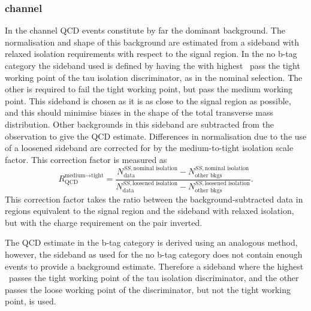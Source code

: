 \subsubsection{\texorpdfstring{\tautau channel}{tau tau channel}}
\label{sec:mssm_bkgs_qcd_tt}
In the \tautau channel QCD events constitute by far the dominant background.
The normalisation and shape 
of this background are estimated from a sideband with relaxed 
isolation requirements with respect to the signal region. 
In the no b-tag category the sideband used is defined
by having the \Pgth with highest \pT~pass the tight working
point of the tau isolation discriminator, as in the nominal selection.
The other \Pgth is required to fail the tight working point,
but pass the medium working point. This sideband is 
chosen as it is as close to the signal region as possible, and 
this should minimise biases in the shape of the total transverse mass
distribution. Other backgrounds
in this sideband are subtracted from the observation to give
the QCD estimate. Differences in normalisation due to
the use of a loosened sideband are corrected for by the medium-to-tight isolation
scale factor. This correction factor is measured as
\begin{equation}\label{eqn:tautau_qcd}
R_{\text{QCD}}^{\text{medium}\rightarrow\text{tight}} = \frac{N_{\text{data}}^{SS,\text{nominal isolation}}-N_{\text{other bkgs}}^{SS,\text{nominal isolation}}}{N_{\text{data}}^{SS,\text{loosened isolation}}-N_{\text{other bkgs}}^{SS,\text{loosened isolation}}}.
\end{equation}
This correction factor takes the ratio between the background-subtracted data in regions 
equivalent to the signal region and the sideband with relaxed isolation, but with the
charge requirement on the pair inverted.

The QCD estimate in the b-tag category is derived using an analogous method, 
 however, the sideband as used for the 
no b-tag category does not contain enough events to 
provide a background estimate. Therefore a sideband where
the highest \pT~\Pgth passes the tight working point of the
tau isolation discriminator, and the other \Pgth passes the loose working
point of the discriminator, but not the tight working point, is used.

